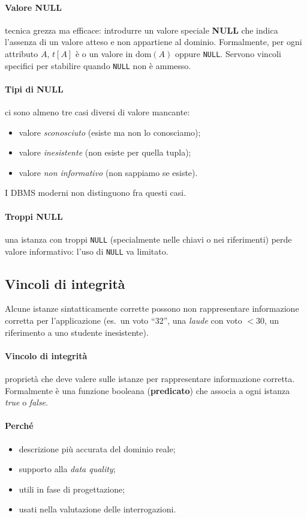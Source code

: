 \documentclass[a4paper,12pt]{article}
\begin{document}
\paragraph{Valore NULL} tecnica grezza ma efficace: introdurre un valore
speciale \textbf{NULL} che indica l'assenza di un valore atteso e non appartiene
al dominio. Formalmente, per ogni attributo $A$, $t[A]$ è o un valore in
$\text{dom}(A)$ oppure \texttt{NULL}. Servono vincoli specifici per stabilire
quando \texttt{NULL} non è ammesso.

\paragraph{Tipi di NULL} ci sono almeno tre casi diversi di valore mancante:
\begin{itemize}
  \item valore \emph{sconosciuto} (esiste ma non lo conosciamo);
  \item valore \emph{inesistente} (non esiste per quella tupla);
  \item valore \emph{non informativo} (non sappiamo se esiste).
\end{itemize}
I DBMS moderni non distinguono fra questi casi.

\paragraph{Troppi NULL} una istanza con troppi \texttt{NULL} (specialmente nelle
chiavi o nei riferimenti) perde valore informativo: l'uso di \texttt{NULL} va
limitato.

\subsection{Vincoli di integrità}

Alcune istanze sintatticamente corrette possono non rappresentare informazione
corretta per l'applicazione (es.\ un voto ``32'', una \emph{laude} con voto
$<30$, un riferimento a uno studente inesistente).

\paragraph{Vincolo di integrità} proprietà che deve valere sulle istanze per
rappresentare informazione corretta. Formalmente è una funzione booleana
(\textbf{predicato}) che associa a ogni istanza \emph{true} o \emph{false}.

\paragraph{Perché}
\begin{itemize}
  \item descrizione più accurata del dominio reale;
  \item supporto alla \emph{data quality};
  \item utili in fase di progettazione;
  \item usati nella valutazione delle interrogazioni.
\end{itemize}
\end{document}

